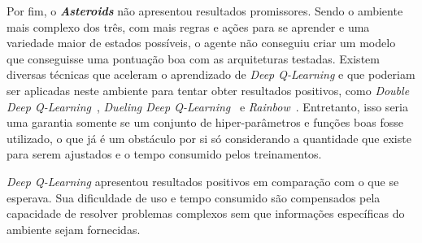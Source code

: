 Por fim, o \textbf{\textit{Asteroids}} não apresentou resultados promissores.
Sendo o ambiente mais complexo dos três, com mais regras e ações para se aprender e uma variedade maior de estados possíveis, o agente não conseguiu criar um modelo que conseguisse uma pontuação boa com as arquiteturas testadas.
Existem diversas técnicas que aceleram o aprendizado de \textit{Deep Q-Learning} e que poderiam ser aplicadas neste ambiente para tentar obter resultados positivos, como \textit{Double Deep Q-Learning}~\cite{DBLP:journals/corr/HasseltGS15}, \textit{Dueling Deep Q-Learning}~\cite{DBLP:journals/corr/WangFL15} e \textit{Rainbow}~\cite{DBLP:journals/corr/abs-1710-02298}.
Entretanto, isso seria uma garantia somente se um conjunto de hiper-parâmetros e funções boas fosse utilizado, o que já é um obstáculo por si só considerando a quantidade que existe para serem ajustados e o tempo consumido pelos treinamentos.

\textit{Deep Q-Learning} apresentou resultados positivos em comparação com o que se esperava.
Sua dificuldade de uso e tempo consumido são compensados pela capacidade de resolver problemas complexos sem que informações específicas do ambiente sejam fornecidas.


%






